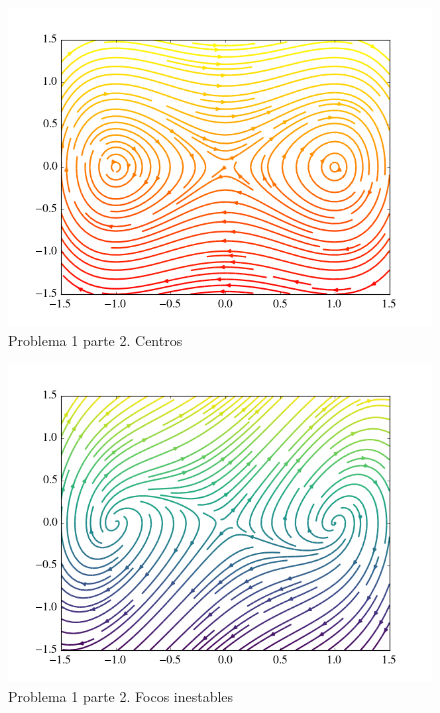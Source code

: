 \documentclass[a4paper,10pt]{article}
\begin{document}
\begin{figure}[h!]
 \centering
\includegraphics[scale=0.3]{problema1fig2}
\caption{Problema 1 parte 2. Centros}
\label{fig:problema1fig2}
\end{figure}

\begin{figure}[h!]
 \centering
\includegraphics[scale=0.3]{problema1fig3}
\caption{Problema 1 parte 2. Focos inestables}
\label{fig:problema1fig3}
\end{figure}
\end{document}

